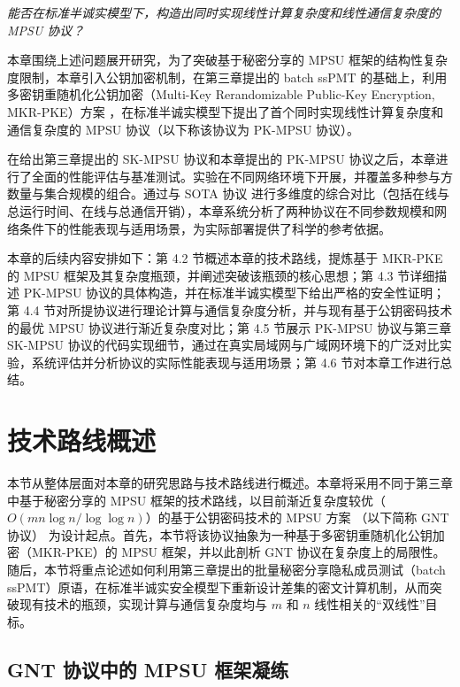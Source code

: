 \begin{center}
\emph{能否在标准半诚实模型下，构造出同时实现线性计算复杂度和线性通信复杂度的 MPSU 协议？}
\end{center}

本章围绕上述问题展开研究，为了突破基于秘密分享的 MPSU 框架的结构性复杂度限制，本章引入公钥加密机制，在第三章提出的 batch ssPMT 的基础上，利用多密钥重随机化公钥加密（Multi-Key Rerandomizable Public-Key Encryption, MKR-PKE）方案 \cite{GNT-eprint-2023}，在标准半诚实模型下提出了首个同时实现线性计算复杂度和通信复杂度的 MPSU 协议（以下称该协议为 PK-MPSU 协议）。

在给出第三章提出的 SK-MPSU 协议和本章提出的 PK-MPSU 协议之后，本章进行了全面的性能评估与基准测试。实验在不同网络环境下开展，并覆盖多种参与方数量与集合规模的组合。通过与 SOTA 协议 \cite{LG-ASIACRYPT-2023} 进行多维度的综合对比（包括在线与总运行时间、在线与总通信开销），本章系统分析了两种协议在不同参数规模和网络条件下的性能表现与适用场景，为实际部署提供了科学的参考依据。

本章的后续内容安排如下：第 4.2 节概述本章的技术路线，提炼基于 MKR-PKE 的 MPSU 框架及其复杂度瓶颈，并阐述突破该瓶颈的核心思想；第 4.3 节详细描述 PK-MPSU 协议的具体构造，并在标准半诚实模型下给出严格的安全性证明；第 4.4 节对所提协议进行理论计算与通信复杂度分析，并与现有基于公钥密码技术的最优 MPSU 协议进行渐近复杂度对比；第 4.5 节展示 PK-MPSU 协议与第三章 SK-MPSU 协议的代码实现细节，通过在真实局域网与广域网环境下的广泛对比实验，系统评估并分析协议的实际性能表现与适用场景；第 4.6 节对本章工作进行总结。

\section{技术路线概述}

本节从整体层面对本章的研究思路与技术路线进行概述。本章将采用不同于第三章中基于秘密分享的 MPSU 框架的技术路线，以目前渐近复杂度较优（$O(m n \log n / \log \log n)$）的基于公钥密码技术的 MPSU 方案 \cite{GNT-eprint-2023}（以下简称 GNT 协议） 为设计起点。首先，本节将该协议抽象为一种基于多密钥重随机化公钥加密（MKR-PKE）的 MPSU 框架，并以此剖析 GNT 协议在复杂度上的局限性。随后，本节将重点论述如何利用第三章提出的批量秘密分享隐私成员测试（batch ssPMT）原语，在标准半诚实安全模型下重新设计差集的密文计算机制，从而突破现有技术的瓶颈，实现计算与通信复杂度均与 $m$ 和 $n$ 线性相关的“双线性”目标。

\subsection{GNT 协议中的 MPSU 框架凝练}

